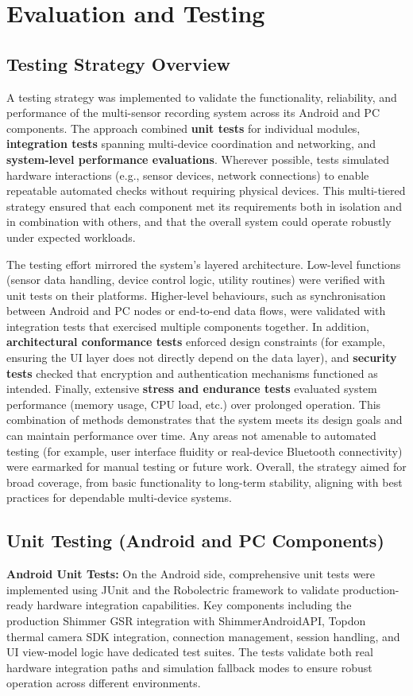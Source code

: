 \chapter{Evaluation and Testing}


\section{Testing Strategy Overview}
A testing strategy was implemented to validate the functionality, reliability, and performance of the multi-sensor recording system across its Android and PC components. The approach combined \textbf{unit tests} for individual modules, \textbf{integration tests} spanning multi-device coordination and networking, and \textbf{system-level performance evaluations}. Wherever possible, tests simulated hardware interactions (e.g., sensor devices, network connections) to enable repeatable automated checks without requiring physical devices. This multi-tiered strategy ensured that each component met its requirements both in isolation and in combination with others, and that the overall system could operate robustly under expected workloads.

The testing effort mirrored the system's layered architecture. Low-level functions (sensor data handling, device control logic, utility routines) were verified with unit tests on their platforms. Higher-level behaviours, such as synchronisation between Android and PC nodes or end-to-end data flows, were validated with integration tests that exercised multiple components together. In addition, \textbf{architectural conformance tests} enforced design constraints (for example, ensuring the UI layer does not directly depend on the data layer), and \textbf{security tests} checked that encryption and authentication mechanisms functioned as intended. Finally, extensive \textbf{stress and endurance tests} evaluated system performance (memory usage, CPU load, etc.) over prolonged operation. This combination of methods demonstrates that the system meets its design goals and can maintain performance over time. Any areas not amenable to automated testing (for example, user interface fluidity or real-device Bluetooth connectivity) were earmarked for manual testing or future work. Overall, the strategy aimed for broad coverage, from basic functionality to long-term stability, aligning with best practices for dependable multi-device systems.


\section{Unit Testing (Android and PC Components)}
\label{sec:unit-testing}
\textbf{Android Unit Tests:} On the Android side, comprehensive unit tests were implemented using JUnit and the Robolectric framework to validate production-ready hardware integration capabilities. Key components including the production Shimmer GSR integration with ShimmerAndroidAPI, Topdon thermal camera SDK integration, connection management, session handling, and UI view-model logic have dedicated test suites. The tests validate both real hardware integration paths and simulation fallback modes to ensure robust operation across different environments.

